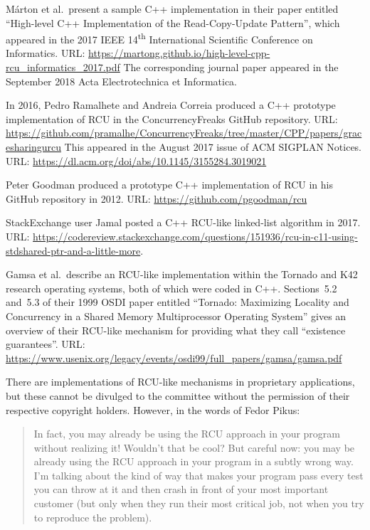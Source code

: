 M\'arton et al.~present a sample C++ implementation in their paper
entitled ``High-level C++ Implementation of the Read-Copy-Update
Pattern'', which appeared in the 2017 IEEE 14\textsuperscript{th}
International Scientific Conference on Informatics.
URL: \url{https://martong.github.io/high-level-cpp-rcu_informatics_2017.pdf}
The corresponding journal paper appeared in the September 2018 Acta
Electrotechnica et Informatica.

In 2016, Pedro Ramalhete and Andreia Correia produced a C++ prototype
implementation of RCU in the ConcurrencyFreaks GitHub repository.
URL: \url{https://github.com/pramalhe/ConcurrencyFreaks/tree/master/CPP/papers/gracesharingurcu}
This appeared in the August 2017 issue of ACM SIGPLAN Notices.
URL: \url{https://dl.acm.org/doi/abs/10.1145/3155284.3019021}

Peter Goodman produced a prototype C++ implementation of RCU in his
GitHub repository in 2012.
URL: \url{https://github.com/pgoodman/rcu}

StackExchange user Jamal posted a C++ RCU-like linked-list algorithm
in 2017.
URL: \url{https://codereview.stackexchange.com/questions/151936/rcu-in-c11-using-stdshared-ptr-and-a-little-more}.

Gamsa et al.~describe an RCU-like implementation within the Tornado
and K42 research operating systems, both of which were coded in C++.
Sections~5.2 and~5.3 of their 1999 OSDI paper entitled ``Tornado: Maximizing
Locality and Concurrency in a Shared Memory Multiprocessor Operating
System'' gives an overview of their RCU-like mechanism for providing
what they call ``existence guarantees''.
URL: \url{https://www.usenix.org/legacy/events/osdi99/full_papers/gamsa/gamsa.pdf}

There are implementations of RCU-like mechanisms in proprietary
applications, but these cannot be divulged to the committee without the
permission of their respective copyright holders.
However, in the words of Fedor Pikus:

\begin{quote}
	In fact, you may already be using the RCU approach in your program
	without realizing it! Wouldn't that be cool? But careful now:
	you may be already using the RCU approach in your program in a
	subtly wrong way. I'm talking about the kind of way that makes
	your program pass every test you can throw at it and then crash
	in front of your most important customer (but only when they
	run their most critical job, not when you try to reproduce
	the problem).
\end{quote}

